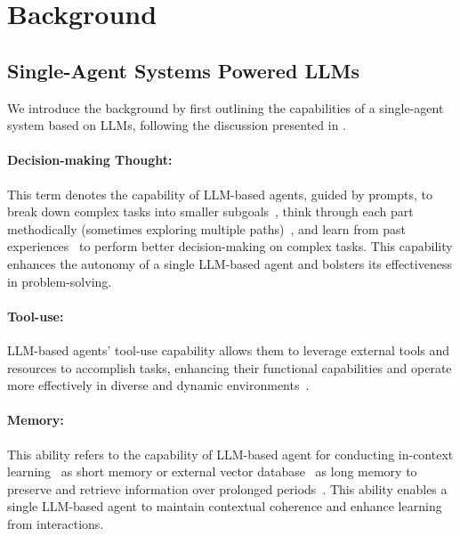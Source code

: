 \section{Background}
\label{Sec2:background}
\subsection{Single-Agent Systems Powered LLMs}
We introduce the background by first outlining the capabilities of a single-agent system based on  LLMs, following the discussion presented in \cite{agent_link}. 

\paragraph{Decision-making Thought:} 
This term denotes the capability of LLM-based agents, guided by prompts, to break down complex tasks into smaller subgoals~\cite{khot2023decomposed}, think through each part methodically (sometimes exploring multiple paths)~\cite{yao2023tree}, and learn from past experiences~\cite{shinn2023reflexion} to perform better decision-making on complex tasks. This capability enhances the autonomy of a single LLM-based agent and bolsters its effectiveness in problem-solving.

\paragraph{Tool-use:} LLM-based agents' tool-use capability allows them to leverage external tools and resources to accomplish tasks, enhancing their functional capabilities and operate more effectively in diverse and dynamic environments~\cite{li2023apibank,ruan2023tptu,gao2023retrieval}.  

\paragraph{Memory:} This ability refers to the capability of LLM-based agent for conducting in-context learning~\cite{dong2023survey} as short memory or external vector database~\cite{lewis2021retrievalaugmented} as long memory to preserve and retrieve information over prolonged periods~\cite{wang2023survey}. This ability enables a single LLM-based agent to maintain contextual coherence and enhance learning from interactions. 


